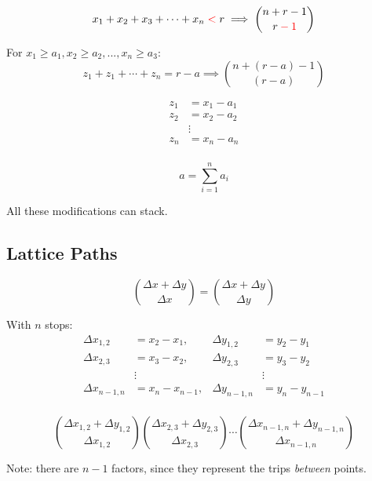 \documentclass{article}
\begin{document}
    \begin{equation}
        x_1 + x_2 + x_3 + \cdots + x_n \color{red}<\color{black} r \implies {n + r - 1 \choose r \color{red}- 1\color{black}}
    \end{equation}

    For $x_1 \geq a_1, x_2 \geq a_2, ..., x_n \geq a_3$: \begin{equation}
        z_1 + z_1 + \cdots + z_n = r - a \implies {n + (r - a) - 1 \choose (r - a)}
    \end{equation}

    \begin{align*}
        z_1 &= x_1 - a_1 \\
        z_2 &= x_2 - a_2 \\
        &\vdots \\
        z_n &= x_n - a_n \\
    \end{align*}

    $$a = \sum_{i=1}^n{a_i}$$

    All these modifications can stack.
        
    \subsection{Lattice Paths}

    \begin{equation}
        {\Delta x + \Delta y \choose \Delta x} = {\Delta x + \Delta y \choose \Delta y}
    \end{equation}

    With $n$ stops: \begin{align*}
        \Delta x_{1,2} & = x_2 - x_1, & \Delta y_{1,2} &= y_2 - y_1 \\
        \Delta x_{2,3} & = x_3 - x_2, & \Delta y_{2,3} &= y_3 - y_2 \\
        & \vdots & & \vdots \\
        \Delta x_{n - 1,n} & = x_n - x_{n - 1}, & \Delta y_{n - 1,n} &= y_n - y_{n - 1} \\
    \end{align*}
    
    \begin{equation}
        {\Delta x_{1,2} + \Delta y_{1,2} \choose \Delta x_{1,2}} {\Delta x_{2,3} + \Delta y_{2,3} \choose \Delta x_{2,3}} \cdots {\Delta x_{n - 1,n} + \Delta y_{n - 1,n} \choose \Delta x_{n - 1,n}} 
    \end{equation}

    Note: there are $n - 1$ factors, since they represent the trips \textit{between} points.
\end{document}
